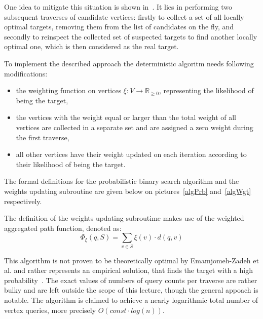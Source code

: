 One idea to mitigate this situation is shown in~\cite{main}. It lies in performing two subsequent traverses of candidate vertices: firstly to collect a set of all locally optimal targets, removing them from the list of candidates on the fly, and secondly to reinspect the collected set of suspected targets to find another locally optimal one, which is then considered as the real target.


To implement the described approach the deterministic algoritm needs following modifications:
\begin{itemize}
	\item the weighting function on vertices $\xi: V \rightarrow \mathds{R}_{\ge 0}$, representing the likelihood of being the target,
	\item the vertices with the weight equal or larger than the total weight of all vertices are collected in a separate set and are assigned a zero weight during the first traverse,
	\item all other vertices have their weight updated on each iteration according to their likelihood of being the target.
\end{itemize}


The formal definitions for the probabilistic binary search algorithm and the weights updating subroutine are given below on pictures~\ref{algPrb} and~\ref{algWgt} respectively.


The definition of the weights updating subroutime makes use of the weighted aggregated path function, denoted as:
	\[\Phi_\xi(q, S) = \sum \limits_{v \in S} \xi(v) \cdot d(q, v)\]

This algorithm is not proven to be theoretically optimal by Emamjomeh-Zadeh et al. and rather represents an empirical solution, that finds the target with a high probability~\cite{main}. The exact values of numbers of query counts per traverse are rather bulky and are left outside the scope of this lecture, though the general appoach is notable. The algorithm is claimed to achieve a nearly logarithmic total number of vertex queries, more precisely $O(const \cdot log(n))$.


